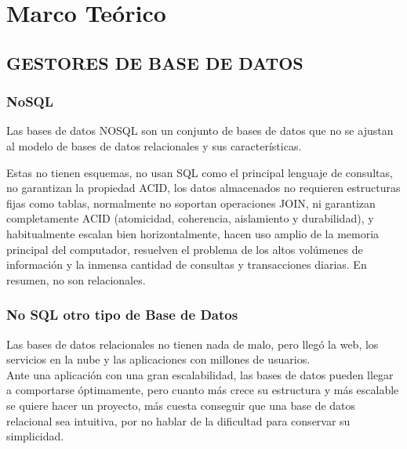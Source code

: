 \documentclass[preprint,12pt]{elsarticle}
\begin{document}



\section{Marco Teórico}


\subsection {\textbf{GESTORES DE BASE DE DATOS}}

\subsubsection{\textbf{NoSQL}}

Las bases de datos NOSQL son un conjunto de bases de datos que no se ajustan al modelo de bases de datos relacionales y sus características.

Estas no tienen esquemas, no usan SQL como el principal lenguaje de consultas, no garantizan la propiedad ACID, los datos almacenados no requieren estructuras fijas como tablas,  normalmente no soportan operaciones JOIN, ni garantizan completamente ACID (atomicidad, coherencia, aislamiento y durabilidad), y habitualmente escalan bien horizontalmente, hacen uso amplio de la memoria principal del computador, resuelven el problema de los altos volúmenes de información y la inmensa cantidad de consultas y transacciones diarias. En resumen, no son relacionales.


\cite{Gartner} 


\subsubsection{\textbf{No SQL otro tipo de Base de Datos}}

Las bases de datos relacionales no tienen nada de malo, pero llegó la web, los servicios en la nube y las aplicaciones con millones de usuarios.
\\
Ante una aplicación con una gran escalabilidad,  las bases de datos pueden llegar a comportarse óptimamente, pero cuanto más crece su estructura y más escalable se quiere hacer un proyecto, más cuesta conseguir que una base de datos relacional sea intuitiva, por no hablar de la dificultad para conservar su simplicidad.
\end{document}
